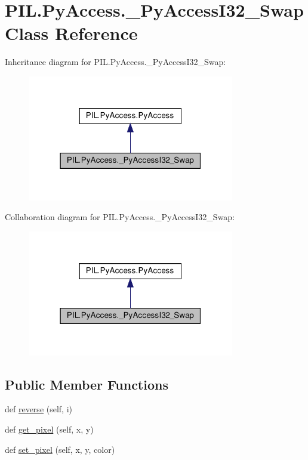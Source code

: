 \hypertarget{classPIL_1_1PyAccess_1_1__PyAccessI32__Swap}{}\section{P\+I\+L.\+Py\+Access.\+\_\+\+Py\+Access\+I32\+\_\+\+Swap Class Reference}
\label{classPIL_1_1PyAccess_1_1__PyAccessI32__Swap}


Inheritance diagram for P\+I\+L.\+Py\+Access.\+\_\+\+Py\+Access\+I32\+\_\+\+Swap\+:
\nopagebreak
\begin{figure}[H]
\begin{center}
\leavevmode
\includegraphics[width=256pt]{classPIL_1_1PyAccess_1_1__PyAccessI32__Swap__inherit__graph}
\end{center}
\end{figure}


Collaboration diagram for P\+I\+L.\+Py\+Access.\+\_\+\+Py\+Access\+I32\+\_\+\+Swap\+:
\nopagebreak
\begin{figure}[H]
\begin{center}
\leavevmode
\includegraphics[width=256pt]{classPIL_1_1PyAccess_1_1__PyAccessI32__Swap__coll__graph}
\end{center}
\end{figure}
\subsection*{Public Member Functions}
\begin{DoxyCompactItemize}
\item 
def \hyperlink{classPIL_1_1PyAccess_1_1__PyAccessI32__Swap_ae82a8083b7fff534ec2d67a422a6e1c7}{reverse} (self, i)
\item 
def \hyperlink{classPIL_1_1PyAccess_1_1__PyAccessI32__Swap_aa0853bb2a191c289f5d630ead69c6472}{get\+\_\+pixel} (self, x, y)
\item 
def \hyperlink{classPIL_1_1PyAccess_1_1__PyAccessI32__Swap_a37cebe4303fb60103b7090ca208f7e89}{set\+\_\+pixel} (self, x, y, color)
\end{DoxyCompactItemize}
